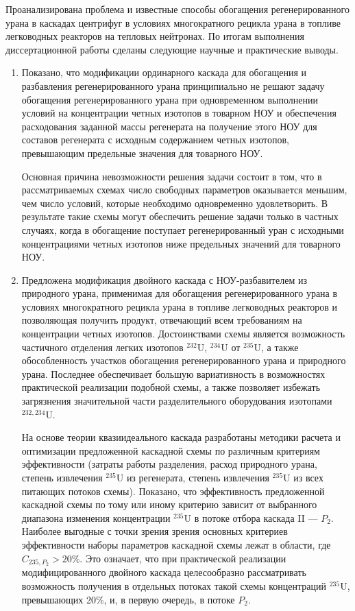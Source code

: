 Проанализирована проблема и известные способы обогащения регенерированного урана в каскадах центрифуг в условиях многократного рецикла урана в топливе легководных реакторов на тепловых нейтронах. По итогам выполнения диссертационной работы сделаны следующие научные и практические выводы.
\begin{enumerate}[label=\Roman*.]
\item Показано, что модификации ординарного каскада для обогащения и разбавления регенерированного урана принципиально не решают задачу обогащения регенерированного урана при одновременном выполнении условий на концентрации четных изотопов в товарном НОУ и обеспечения расходования заданной массы регенерата на получение этого НОУ для составов регенерата с исходным содержанием четных изотопов, превышающим предельные значения для товарного НОУ. 

Основная причина невозможности решения задачи состоит в том, что в рассматриваемых схемах число свободных параметров оказывается меньшим, чем число условий, которые необходимо одновременно удовлетворить. В результате такие схемы могут обеспечить решение задачи только в частных случаях, когда в обогащение поступает регенерированный уран с исходными концентрациями четных изотопов ниже предельных значений для товарного НОУ.

\item Предложена модификация двойного каскада с НОУ-разбавителем из природного урана, применимая для обогащения регенерированного урана в условиях многократного рецикла урана в топливе легководных реакторов и позволяющая получить продукт, отвечающий всем требованиям на концентрации четных изотопов. Достоинствами схемы является возможность частичного отделения легких изотопов $^{232}$U, $^{234}$U от $^{235}$U, а также обособленность участков обогащения регенерированного урана и природного урана. Последнее обеспечивает большую вариативность в возможностях практической реализации подобной схемы, а также позволяет избежать загрязнения значительной части разделительного оборудования изотопами $^{232,234}$U. 

На основе теории квазиидеального каскада разработаны методики расчета и оптимизации предложенной каскадной схемы по различным критериям эффективности (затраты работы разделения, расход природного урана, степень извлечения $^{235}$U из регенерата, степень извлечения $^{235}$U из всех питающих потоков схемы). Показано, что эффективность предложенной каскадной схемы по тому или иному критерию зависит от выбранного диапазона изменения концентрации $^{235}$U в потоке отбора каскада II --- $P_2$. Наиболее выгодные с точки зрения зрения основных критериев эффективности наборы параметров каскадной схемы лежат в области, где $C_{235,{P_2}} > 20\%$. Это означает, что при практической реализации модифицированного двойного каскада целесообразно рассматривать возможность получения в отдельных потоках такой схемы концентраций $^{235}$U, превышающих 20\%, и, в первую очередь, в потоке $P_2$. 


\end{enumerate}
